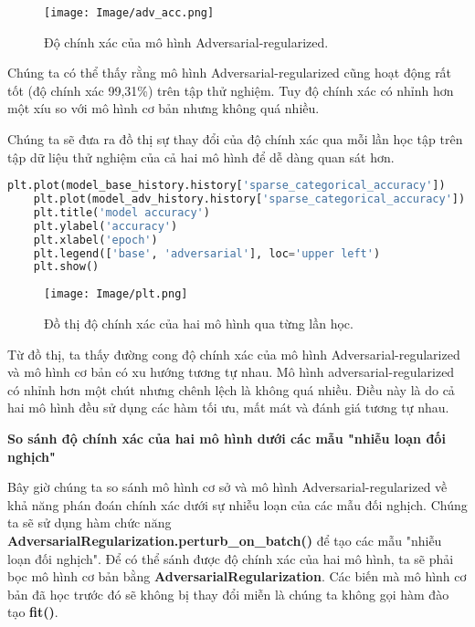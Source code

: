 \begin{figure}[h!]
    \centering
    \texttt{[image: Image/adv\_acc.png]}
    \caption{Độ chính xác của mô hình Adversarial-regularized.}
    \label{fig 2.3:Độ chính xác của mô hình Adversarial-regularized}
\end{figure}

Chúng ta có thể thấy rằng mô hình Adversarial-regularized cũng hoạt động rất tốt (độ chính xác 99,31\%) trên tập thử nghiệm. Tuy độ chính xác có nhỉnh hơn một xíu so với mô hình cơ bản
nhưng không quá nhiều.

Chúng ta sẽ đưa ra đồ thị sự thay đổi của độ chính xác qua mỗi lần học tập trên tập dữ liệu thử nghiệm của cả hai mô hình để dễ dàng quan sát hơn.
\begin{lstlisting}[language=Python]
    plt.plot(model_base_history.history['sparse_categorical_accuracy'])
    plt.plot(model_adv_history.history['sparse_categorical_accuracy'])
    plt.title('model accuracy')
    plt.ylabel('accuracy')
    plt.xlabel('epoch')
    plt.legend(['base', 'adversarial'], loc='upper left')
    plt.show()
\end{lstlisting}

\begin{figure}[h!]
    \centering
    \texttt{[image: Image/plt.png]}
    \caption{Đồ thị độ chính xác của hai mô hình qua từng lần học.}
    \label{fig 2.4:Đồ thị độ chính xác của hai mô hình qua từng lần học.}
    
\end{figure}

Từ đồ thị, ta thấy đường cong độ chính xác của mô hình Adversarial-regularized và mô hình cơ bản có xu hướng tương tự nhau. Mô hình adversarial-regularized có nhỉnh hơn một chút nhưng chênh lệch là không quá nhiều. 
Điều này là do cả hai mô hình đều sử dụng các hàm tối ưu, mất mát và đánh giá tương tự nhau.

\textbf{So sánh độ chính xác của hai mô hình dưới các mẫu "nhiễu loạn đối nghịch"}

Bây giờ chúng ta so sánh mô hình cơ sở và mô hình Adversarial-regularized về khả năng phán đoán chính xác dưới sự nhiễu loạn của các mẫu đối nghịch.
Chúng ta sẽ sử dụng hàm chức năng \textbf{AdversarialRegularization.perturb\_on\_batch()} để tạo các mẫu "nhiễu loạn đối nghịch". Để có thể sánh được độ chính xác của hai mô hình,
ta sẽ phải bọc mô hình cơ bản bằng \textbf{AdversarialRegularization}. Các biến mà mô hình cơ bản đã học trước đó sẽ không bị thay đổi miễn là chúng ta không gọi hàm đào tạo \textbf{fit()}.

